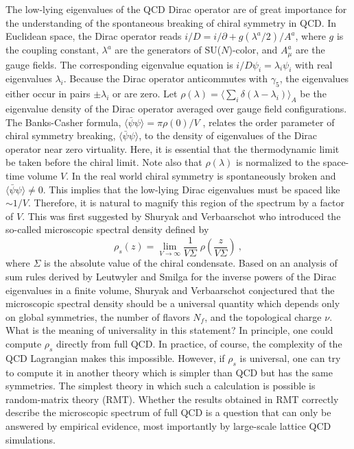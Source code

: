 The low-lying eigenvalues of the QCD Dirac operator are of great
importance for the understanding of the spontaneous breaking of chiral
symmetry in QCD.  In Euclidean space, the Dirac operator reads
$i\slash D=i\slash\partial+g(\lambda^a/2)\slash A^a$, where $g$ is the
coupling constant, $\lambda^a$ are the generators of SU($N$)-color,
and $A_\mu^a$ are the gauge fields.  The corresponding eigenvalue
equation is $i\slash D \psi_i=\lambda_i \psi_i$ with real eigenvalues
$\lambda_i$.  Because the Dirac operator anticommutes with $\gamma_5$,
the eigenvalues either occur in pairs $\pm\lambda_i$ or are zero.  Let
$\rho(\lambda) = \langle \sum_i\delta(\lambda-\lambda_i)\rangle_A$ be
the eigenvalue density of the Dirac operator averaged over gauge field
configurations.  The Banks-Casher formula,
$\langle\bar\psi\psi\rangle=\pi\rho(0)/V$ \cite{Bank80}, relates the
order parameter of chiral symmetry breaking,
$\langle\bar\psi\psi\rangle$, to the density of eigenvalues of the
Dirac operator near zero virtuality.  Here, it is essential that the
thermodynamic limit be taken before the chiral limit.  Note also that
$\rho(\lambda)$ is normalized to the space-time volume $V$.  In the
real world chiral symmetry is spontaneously broken and
$\langle\bar\psi\psi\rangle\ne 0$.  This implies that the low-lying
Dirac eigenvalues must be spaced like $\sim 1/V$.  Therefore, it is
natural to magnify this region of the spectrum by a factor of $V$.
This was first suggested by Shuryak and Verbaarschot \cite{Shur93} who
introduced the so-called microscopic spectral density defined by
\begin{equation}
  \label{eq1.1}
  \rho_s(z)=\lim_{V\to \infty}\frac{1}{V\Sigma}\;
  \rho\left(\frac{z}{V\Sigma}\right)\:,
\end{equation}
where $\Sigma$ is the absolute value of the chiral condensate.  Based
on an analysis of sum rules derived by Leutwyler and Smilga
\cite{Leut92} for the inverse powers of the Dirac eigenvalues in a
finite volume, Shuryak and Verbaarschot conjectured that the
microscopic spectral density should be a universal quantity which
depends only on global symmetries, the number of flavors $N_f$, and
the topological charge $\nu$.  What is the meaning of universality in
this statement?  In principle, one could compute $\rho_s$ directly
from full QCD.  In practice, of course, the complexity of the QCD
Lagrangian makes this impossible.  However, if $\rho_s$ is universal,
one can try to compute it in another theory which is simpler than QCD
but has the same symmetries.  The simplest theory in which such a
calculation is possible is random-matrix theory (RMT).  Whether the
results obtained in RMT correctly describe the microscopic spectrum of
full QCD is a question that can only be answered by empirical
evidence, most importantly by large-scale lattice QCD simulations.

